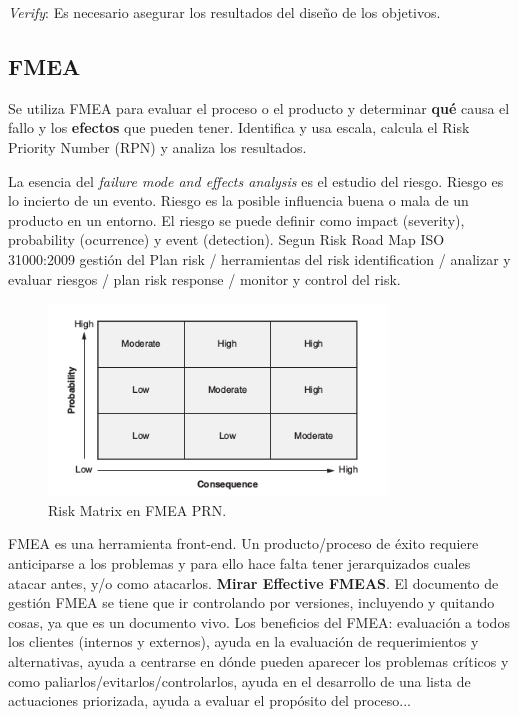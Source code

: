 \documentclass[]{article}
\begin{document}
\textit{Verify}: Es necesario asegurar los resultados del diseño de los objetivos. 

\subsection{FMEA} Se utiliza FMEA para evaluar el proceso o el producto y determinar \textbf{qué} causa el fallo y los \textbf{efectos} que pueden tener. 
Identifica y usa escala, calcula el Risk Priority Number (RPN) y analiza los resultados.

La esencia del \textit{failure mode and effects analysis} es el estudio del riesgo. Riesgo es lo incierto de un evento. Riesgo es la posible influencia buena o mala de un producto en un entorno. El riesgo se puede definir como impact (severity), probability (ocurrence) y event (detection). Segun Risk Road Map ISO 31000:2009 gestión del Plan risk / herramientas del risk identification / analizar y evaluar riesgos / plan risk response / monitor y control del risk.

\begin{figure}[ht!]
	\centering
	\includegraphics[width=90mm]{imagenes/RiskMatrix.png}
	\caption{Risk Matrix en FMEA PRN.}
	\label{fig:kMatrix}
\end{figure}

FMEA es una herramienta front-end. Un producto/proceso de éxito requiere anticiparse a los problemas y para ello hace falta tener jerarquizados cuales atacar antes, y/o como atacarlos. \textbf{Mirar Effective FMEAS}. El documento de gestión FMEA se tiene que ir controlando por versiones, incluyendo y quitando cosas, ya que es un documento vivo. Los beneficios del FMEA: evaluación a todos los clientes (internos y externos), ayuda en la evaluación de requerimientos y alternativas, ayuda a centrarse en dónde pueden aparecer los problemas críticos y como paliarlos/evitarlos/controlarlos, ayuda en el desarrollo de una lista de actuaciones priorizada, ayuda a evaluar el propósito del proceso...
\end{document}
